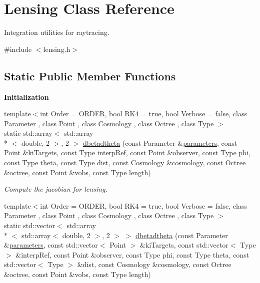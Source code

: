 \hypertarget{classLensing}{\section{Lensing Class Reference}
\label{classLensing}
}


Integration utilities for raytracing.  




{\ttfamily \#include $<$lensing.\-h$>$}

\subsection*{Static Public Member Functions}
\begin{Indent}{\bf Initialization}\par
\begin{DoxyCompactItemize}
\item 
{\footnotesize template$<$int Order = O\-R\-D\-E\-R, bool R\-K4 = true, bool Verbose = false, class Parameter , class Point , class Cosmology , class Octree , class Type $>$ }\\static std\-::array$<$ std\-::array\\*
$<$ double, 2 $>$, 2 $>$ \hyperlink{classLensing_aec15f2b6e1756426a235cc2384b3c8cb}{dbetadtheta} (const Parameter \&\hyperlink{rays_8h_ae1bc8b0b8c8b9f8e4cc61a5cc7c4ce9e}{parameters}, const Point \&ki\-Targets, const Type interp\-Ref, const Point \&observer, const Type phi, const Type theta, const Type dist, const Cosmology \&cosmology, const Octree \&octree, const Point \&vobs, const Type length)
\begin{DoxyCompactList}\small\item\em Compute the jacobian for lensing. \end{DoxyCompactList}\item 
{\footnotesize template$<$int Order = O\-R\-D\-E\-R, bool R\-K4 = true, bool Verbose = false, class Parameter , class Point , class Cosmology , class Octree , class Type $>$ }\\static std\-::vector$<$ std\-::array\\*
$<$ std\-::array$<$ double, 2 $>$, 2 $>$ $>$ \hyperlink{classLensing_a756b7cbe64b3ab8d70b6c9f6a951bf04}{dbetadtheta} (const Parameter \&\hyperlink{rays_8h_ae1bc8b0b8c8b9f8e4cc61a5cc7c4ce9e}{parameters}, const std\-::vector$<$ Point $>$ \&ki\-Targets, const std\-::vector$<$ Type $>$ \&interp\-Ref, const Point \&observer, const Type phi, const Type theta, const std\-::vector$<$ Type $>$ \&dist, const Cosmology \&cosmology, const Octree \&octree, const Point \&vobs, const Type length)

\end{DoxyCompactItemize}
\end{Indent}

